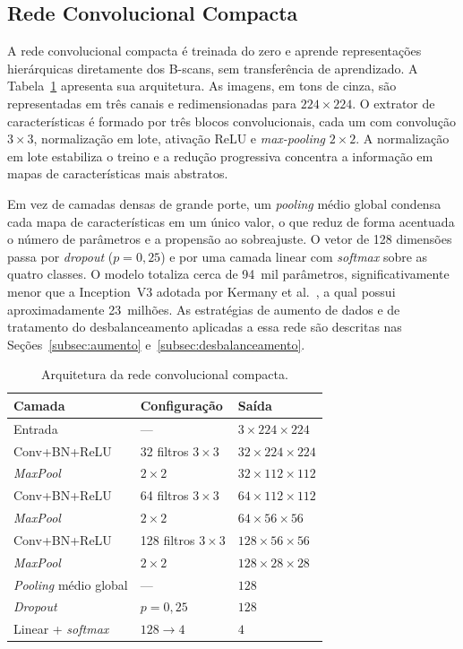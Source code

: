 \documentclass[conference]{IEEEtran}
\begin{document}
\subsection{Rede Convolucional Compacta}
\label{subsec:cnn}

A rede convolucional compacta é treinada do zero e aprende representações hierárquicas diretamente dos B-scans, sem transferência de aprendizado. A Tabela~\ref{tab:cnn} apresenta sua arquitetura. As imagens, em tons de cinza, são representadas em três canais e redimensionadas para $224\times224$. O extrator de características é formado por três blocos convolucionais, cada um com convolução $3\times3$, normalização em lote, ativação ReLU e \textit{max-pooling} $2\times2$. A normalização em lote estabiliza o treino e a redução progressiva concentra a informação em mapas de características mais abstratos.

Em vez de camadas densas de grande porte, um \textit{pooling} médio global condensa cada mapa de características em um único valor, o que reduz de forma acentuada o número de parâmetros e a propensão ao sobreajuste. O vetor de 128 dimensões passa por \textit{dropout} ($p=0{,}25$) e por uma camada linear com \textit{softmax} sobre as quatro classes. O modelo totaliza cerca de 94~mil parâmetros, significativamente menor que a Inception~V3 adotada por Kermany et al.~\cite{kermany2018}, a qual possui aproximadamente 23~milhões. As estratégias de aumento de dados e de tratamento do desbalanceamento aplicadas a essa rede são descritas nas Seções~\ref{subsec:aumento} e~\ref{subsec:desbalanceamento}.

\begin{table}[t]
\caption{Arquitetura da rede convolucional compacta.}
\label{tab:cnn}
\centering
\footnotesize
\setlength{\tabcolsep}{5pt}
\renewcommand{\arraystretch}{1.2}
\begin{tabular}{l l l}
\toprule
\textbf{Camada} & \textbf{Configuração} & \textbf{Saída} \\
\midrule
Entrada & --- & $3\times224\times224$ \\
Conv+BN+ReLU & 32 filtros $3\times3$ & $32\times224\times224$ \\
\textit{MaxPool} & $2\times2$ & $32\times112\times112$ \\
Conv+BN+ReLU & 64 filtros $3\times3$ & $64\times112\times112$ \\
\textit{MaxPool} & $2\times2$ & $64\times56\times56$ \\
Conv+BN+ReLU & 128 filtros $3\times3$ & $128\times56\times56$ \\
\textit{MaxPool} & $2\times2$ & $128\times28\times28$ \\
\textit{Pooling} médio global & --- & $128$ \\
\textit{Dropout} & $p=0{,}25$ & $128$ \\
Linear + \textit{softmax} & $128 \to 4$ & $4$ \\
\bottomrule
\end{tabular}
\end{table}
\end{document}
